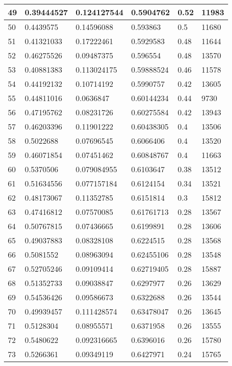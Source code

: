 \begin{longtable}{|l|l|l|l|l|l|}
49 & 0.39444527 & 0.124127544 & 0.5904762 & 0.52 & 11983 \\ \hline 
50 & 0.4439575 & 0.14596088 & 0.593863 & 0.5 & 11680 \\ \hline 
51 & 0.41321033 & 0.17222461 & 0.5929583 & 0.48 & 11644 \\ \hline 
52 & 0.46275526 & 0.09487375 & 0.596554 & 0.48 & 13570 \\ \hline 
53 & 0.40881383 & 0.113024175 & 0.59888524 & 0.46 & 11578 \\ \hline 
54 & 0.44192132 & 0.10714192 & 0.5990757 & 0.42 & 13605 \\ \hline 
55 & 0.44811016 & 0.0636847 & 0.60144234 & 0.44 & 9730 \\ \hline 
56 & 0.47195762 & 0.08231726 & 0.60275584 & 0.42 & 13943 \\ \hline 
57 & 0.46203396 & 0.11901222 & 0.60438305 & 0.4 & 13506 \\ \hline 
58 & 0.5022688 & 0.07696545 & 0.6066406 & 0.4 & 13520 \\ \hline 
59 & 0.46071854 & 0.07451462 & 0.60848767 & 0.4 & 11663 \\ \hline 
60 & 0.5370506 & 0.079084955 & 0.6103647 & 0.38 & 13512 \\ \hline 
61 & 0.51634556 & 0.077157184 & 0.6124154 & 0.34 & 13521 \\ \hline 
62 & 0.48173067 & 0.11352785 & 0.6151814 & 0.3 & 15812 \\ \hline 
63 & 0.47416812 & 0.07570085 & 0.61761713 & 0.28 & 13567 \\ \hline 
64 & 0.50767815 & 0.07436665 & 0.6199891 & 0.28 & 13606 \\ \hline 
65 & 0.49037883 & 0.08328108 & 0.6224515 & 0.28 & 13568 \\ \hline 
66 & 0.5081552 & 0.08963094 & 0.62455106 & 0.28 & 13548 \\ \hline 
67 & 0.52705246 & 0.09109414 & 0.62719405 & 0.28 & 15887 \\ \hline 
68 & 0.51352733 & 0.09038847 & 0.6297977 & 0.26 & 13629 \\ \hline 
69 & 0.54536426 & 0.09586673 & 0.6322688 & 0.26 & 13544 \\ \hline 
70 & 0.49939457 & 0.111428574 & 0.63478047 & 0.26 & 13645 \\ \hline 
71 & 0.5128304 & 0.08955571 & 0.6371958 & 0.26 & 13555 \\ \hline 
72 & 0.5480622 & 0.092316665 & 0.6396016 & 0.26 & 15780 \\ \hline 
73 & 0.5266361 & 0.09349119 & 0.6427971 & 0.24 & 15765 \\ \hline 

\end{longtable}
